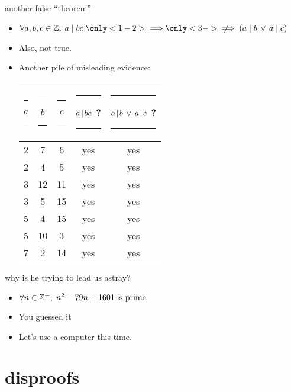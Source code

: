 \documentclass[handout,landscape]{beamer}
\newcommand{\notimplies}{\;\not\!\!\!\implies}
\begin{document}
\begin{frame}{another false ``theorem''}
\begin{itemize}
\item $\forall a,b,c \in \Integers, \; a \mid bc \; \only<1-2>{\implies} \only<3->{\,\notimplies} \; ( a \mid b \, \lor \, a \mid c )$ \pause
\item Also, not true.\pause \pause
\item Another pile of misleading evidence: \pause

\begin{center}
\begin{tabular}{ccc|c|c}
\rule[-4pt]{0pt}{20pt}\rule{6pt}{0pt}$a$\rule{6pt}{0pt} & \rule{6pt}{0pt}$b$\rule{6pt}{0pt} & \rule{6pt}{0pt}$c$\rule{6pt}{0pt} & \rule{6pt}{0pt}$a \!\mid\! bc$ ?\rule{6pt}{0pt} & \rule{6pt}{0pt}$ a \!\mid\! b \, \lor \, a \!\mid\! c $ ? \rule{6pt}{0pt}\\ \hline
\rule[-4pt]{0pt}{20pt}2 & 7 & 6 & yes & yes \\  
\rule[-4pt]{0pt}{20pt}2 & 4 & 5 & yes & yes \\  
\rule[-4pt]{0pt}{20pt}3 & 12 & 11 & yes & yes \\
\rule[-4pt]{0pt}{20pt}3 & 5 & 15 & yes & yes \\
\rule[-4pt]{0pt}{20pt}5 & 4 & 15 & yes & yes \\
\rule[-4pt]{0pt}{20pt}5 & 10 & 3 & yes & yes \\
\rule[-4pt]{0pt}{20pt}7 & 2 & 14 & yes & yes \\
\end{tabular}
\end{center}
\end{itemize}
\end{frame}

\begin{frame}{why is he trying to lead us astray?}
\begin{itemize}
\item $\forall n \in {\mathbb Z}^+, \; n^2 - 79n + 1601 \; \mbox{is prime} $ \pause
\item You guessed it\textellipsis \pause
\item Let's use a computer this time.
\end{itemize}
\end{frame}

\section{disproofs}
\end{document}
